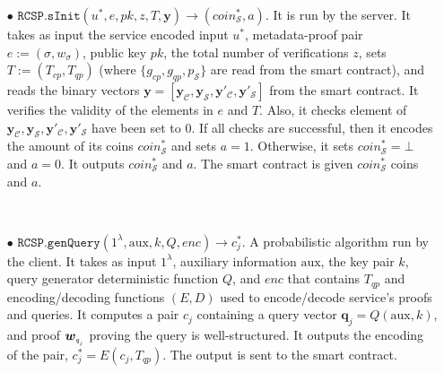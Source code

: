 \begin{definition}[RC-S-P Scheme]
\begin{itemize}
\

\item[$\bullet$] $\mathtt{RCSP}.\mathtt{sInit}(u^{\scriptscriptstyle *},e, pk,z, T,\bm{y})\rightarrow (coin^{\scriptscriptstyle *}_{\scriptscriptstyle\mathcal S},a)$. It is  run by the server. It takes as input the  service encoded input $u^{\scriptscriptstyle *}$, metadata-proof pair $e:=(\sigma,w_{\scriptscriptstyle\sigma})$,  public key $pk$, the total number of verifications $z$, sets $T:=(T_{\scriptscriptstyle cp},T_{\scriptscriptstyle qp})$ (where $\{g_{\scriptscriptstyle cp},  g_{\scriptscriptstyle qp},p_{\scriptscriptstyle\mathcal S}\}$ are read from the smart contract), and reads the  binary vectors $\bm{y}=[\bm{y}_{\scriptscriptstyle \mathcal  C}, \bm{y}_{\scriptscriptstyle \mathcal  S},\bm{y}'_{\scriptscriptstyle \mathcal  C}, \bm{y}'_{\scriptscriptstyle \mathcal  S}]$ from the smart contract.  It verifies the validity of the elements in $e$ and  $T$. Also, it checks element of $\bm{y}_{\scriptscriptstyle \mathcal  C}, \bm{y}_{\scriptscriptstyle \mathcal  S},\bm{y}'_{\scriptscriptstyle \mathcal  C}, \bm{y}'_{\scriptscriptstyle \mathcal  S}$ have been set to $0$. If all checks are successful, then it encodes the amount of its coins  $coin^{\scriptscriptstyle*}_{\scriptscriptstyle\mathcal S}$ and sets $a=1$. Otherwise, it sets $coin^{\scriptscriptstyle *}_{\scriptscriptstyle\mathcal S}=\bot$ and $a=0$. It outputs $coin^{\scriptscriptstyle *}_{\scriptscriptstyle\mathcal S}$ and $a$. The smart contract is given $coin^{\scriptscriptstyle *}_{\scriptscriptstyle\mathcal S}$ coins and $a$.  

\

\item[$\bullet$] $\mathtt{RCSP}.\mathtt{genQuery}(1^\lambda, \text{aux},k,Q, enc)\rightarrow c^{\scriptscriptstyle *}_{\scriptscriptstyle j}$. A probabilistic algorithm run by the client. It takes as input  $1^\lambda$,  auxiliary information $\text{aux}$,  the key pair $k$,   query generator deterministic function $Q$,  and $enc$ that contains $T_{\scriptscriptstyle qp}$ and  encoding/decoding functions $(E,D)$  used to encode/decode service's proofs and queries.  It computes a pair $c_{\scriptscriptstyle j}$ containing a query vector $\bm{q}_{\scriptscriptstyle j}=Q( \text{aux},k)$,  and proof $\bm{w}_{\scriptscriptstyle q_{_{\scaleto{j}{\size}}}}$ proving the query is well-structured. It outputs the encoding of the pair, $c^{\scriptscriptstyle *}_{\scriptscriptstyle j}=E(c_{\scriptscriptstyle j},T_{\scriptscriptstyle qp})$. The output is sent to the smart contract. 


\end{itemize}
\end{definition}
